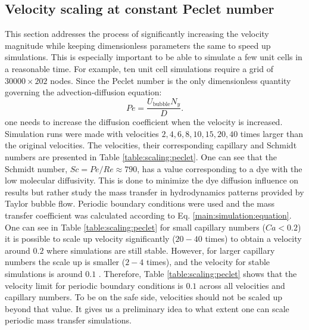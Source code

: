 \documentclass[review,12pt]{elsarticle}
\newcommand{\beq}{\begin{equation}}
\newcommand{\feq}{\end{equation}}
\newcommand{\ububble}{U_{\mathrm{bubble}}}
\newcommand{\omegaminus}{\omega_{-}}
\begin{document}
\subsection{Velocity scaling at constant Peclet number}
\label{section:keeping:peclet}
This section addresses the process of significantly increasing the
velocity magnitude while keeping dimensionless parameters the same to
speed up                                      
simulations. This is especially important to be able to simulate a few unit cells in a reasonable time.
For example, ten unit cell simulations require a grid of $30000\times202$ nodes.
Since the Peclet number is the only dimensionless quantity governing
the advection-diffusion equation:
\beq
Pe=\frac{\ububble N_y}{D}.
\feq
one needs to increase the diffusion coefficient when the velocity is increased. Simulation runs were made with
velocities $2,4,6,8,10,15,20,40$ times larger than the original velocities. {\color{red} The velocities,
their corresponding capillary and Schmidt numbers are presented in Table \ref{table:scaling:peclet}. One can see that the Schmidt number, $Sc=Pe/Re\approx 790$, has a value corresponding to a dye with the low molecular diffusivity. This is done to minimize the dye diffusion influence on results but rather study the mass transfer in hydrodynamics patterns provided by Taylor bubble flow.} Periodic
boundary conditions were used and the mass transfer coefficient was calculated according to Eq.
\ref{main:simulation:equation}. 
{\color{red} One can see} in Table \ref{table:scaling:peclet} for small capillary numbers ($Ca<0.2$)  it is possible to scale up velocity significantly ($20-40$ times) to obtain a velocity around $0.2$ where simulations are still stable. However, for larger capillary numbers the scale up is smaller ($2-4$ times), and the velocity for stable simulations is around $0.1$ . 
Therefore, Table \ref{table:scaling:peclet} shows that the velocity limit
for  periodic boundary conditions is $0.1$ {\color{red} across all velocities and capillary numbers}. To be on the safe side, velocities should not be scaled
up beyond that value.   %
It gives us a
preliminary idea to what extent one can scale periodic mass transfer simulations. 
\end{document}
